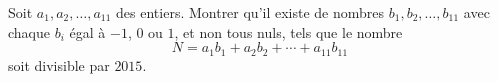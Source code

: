 \documentclass[varwidth]{standalone}
\begin{document}
    Soit $a_1, a_2, \dots, a_{11}$ des entiers. Montrer qu'il existe de nombres $b_1, b_2, \dots, b_{11}$ avec chaque $b_i$ \'egal \`a $-1$, $0$ ou $1$, et non tous nuls, tels que le nombre
    \[
        N = a_1 b_1 + a_2 b_2 + \dotsb + a_{11} b_{11}  
    \]
    soit divisible par $2015$.
\end{document}
